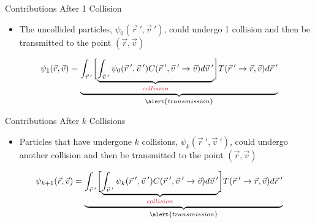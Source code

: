 \documentclass[xcolor=x11names,compress, handout]{beamer}
\renewcommand{\(}{\begin{columns}}
\renewcommand{\)}{\end{columns}}
\newcommand{\<}[1]{\begin{column}{#1}}
\renewcommand{\>}{\end{column}}
\begin{document}
\begin{frame}{Contributions After 1 Collision}

\begin{itemize}
\item The uncollided particles, $\psi_0(\vec{r}\:', \vec{v}\:')$, could undergo 1 \textcolor{cardinal}{collision} and then be \alert{transmitted} to the point $(\vec{r}, \vec{v})$
\end{itemize}

\[\psi_1(\vec{r}, \vec{v}) = \underbrace{\int_{\vec{r}\:'} \biggl[ \underbrace{\int_{\vec{v}\:'} \psi_0(\vec{r}\:', \vec{v}\:') C(\vec{r}\:', \vec{v}\:' \rightarrow \vec{v})  d\vec{v}\:'}_{\textcolor{cardinal}{collision}}\biggr] T(\vec{r}\:' \rightarrow \vec{r}, \vec{v}) d\vec{r}\:'}_{\alert{transmission}}\]

\end{frame}


\begin{frame}{Contributions After $k$ Collisions}

\begin{itemize}
\item Particles that have undergone $k$ collisions, $\psi_k(\vec{r}\:', \vec{v}\:')$, could undergo another \textcolor{cardinal}{collision} and then be \alert{transmitted} to the point $(\vec{r}, \vec{v})$ 
\end{itemize}

\[\psi_{k+1}(\vec{r}, \vec{v}) = \underbrace{\int_{\vec{r}\:'} \biggl[ \underbrace{\int_{\vec{v}\:'} \psi_k(\vec{r}\:', \vec{v}\:') C(\vec{r}\:', \vec{v}\:' \rightarrow \vec{v})  d\vec{v}\:'}_{\textcolor{cardinal}{collision}}\biggr] T(\vec{r}\:' \rightarrow \vec{r}, \vec{v}) d\vec{r}\:'}_{\alert{transmission}}\]

\end{frame}
\end{document}

